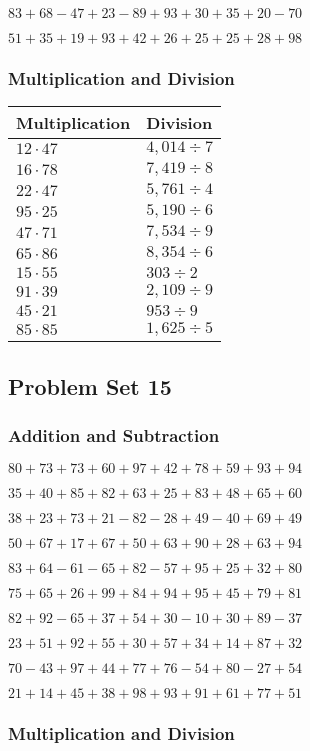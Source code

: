 \(83+68-47+23-89+93+30+35+20-70\)

\(51+35+19+93+42+26+25+25+28+98\)

\hypertarget{multiplication-and-division-54}{%
\subsubsection{Multiplication and
Division}\label{multiplication-and-division-54}}

\begin{longtable}[]{@{}ll@{}}
\toprule
Multiplication & Division\tabularnewline
\midrule
\endhead
\(12\cdot47\) & \(4,014÷7\)\tabularnewline
\(16\cdot78\) & \(7,419÷8\)\tabularnewline
\(22\cdot47\) & \(5,761÷4\)\tabularnewline
\(95\cdot25\) & \(5,190÷6\)\tabularnewline
\(47\cdot71\) & \(7,534÷9\)\tabularnewline
\(65\cdot86\) & \(8,354÷6\)\tabularnewline
\(15\cdot55\) & \(303÷2\)\tabularnewline
\(91\cdot39\) & \(2,109÷9\)\tabularnewline
\(45\cdot21\) & \(953÷9\)\tabularnewline
\(85\cdot85\) & \(1,625÷5\)\tabularnewline
\bottomrule
\end{longtable}

\hypertarget{problem-set-15-1}{%
\subsection{Problem Set 15}\label{problem-set-15-1}}

\hypertarget{addition-and-subtraction-55}{%
\subsubsection{Addition and
Subtraction}\label{addition-and-subtraction-55}}

\(80+73+73+60+97+42+78+59+93+ 94\)

\(35+40+85+82+63+25+83+48+65+60\)

\(38+23+73+21-82-28+49-40+69+49\)

\(50+67+17+67+50+63+90+28+63+94\)

\(83+64-61-65+82-57+95+25+32+80\)

\(75+65+26+99+84+94+95+45+79+81\)

\(82+92-65+37+54+30-10+30+89-37\)

\(23+51+92+55+30+57+34+14+87+32\)

\(70-43+97+44+77+76-54+80-27+54\)

\(21+14+45+38+98+93+91+61+77+51\)

\hypertarget{multiplication-and-division-55}{%
\subsubsection{Multiplication and
Division}\label{multiplication-and-division-55}}

